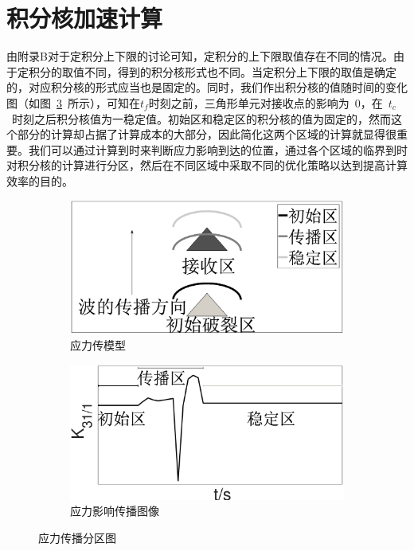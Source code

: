     \section{积分核加速计算}

    \indent 由附录B对于定积分上下限的讨论可知，定积分的上下限取值存在不同的情况。由于定积分的取值不同，得到的积分核形式也不同。当定积分上下限的取值是确定的，对应积分核的形式应当也是固定的。同时，我们作出积分核的值随时间的变化图（如图~\ref{fig:yinglichuanbotuxiang}~所示），可知在$t_f$时刻之前，三角形单元对接收点的影响为~0，在~$t_{c}$~时刻之后积分核值为一稳定值。初始区和稳定区的积分核的值为固定的，然而这个部分的计算却占据了计算成本的大部分，因此简化这两个区域的计算就显得很重要。我们可以通过计算到时来判断应力影响到达的位置，通过各个区域的临界到时对积分核的计算进行分区，然后在不同区域中采取不同的优化策略以达到提高计算效率的目的。
  

\begin{figure}[ht]
  \centering
  \begin{subfigure}[b]{0.45\linewidth}
    \includegraphics[width=\linewidth]{img/model_1.eps}
    \caption{应力传模型}\label{fig:yinglimoxin}
  \end{subfigure}
  \begin{subfigure}[b]{0.45\linewidth}
    \includegraphics[width=\linewidth]{img/model_2.eps}
    \caption{应力影响传播图像}\label{fig:yinglichuanbotuxiang}
  \end{subfigure}
  \caption{应力传播分区图}
\end{figure}

